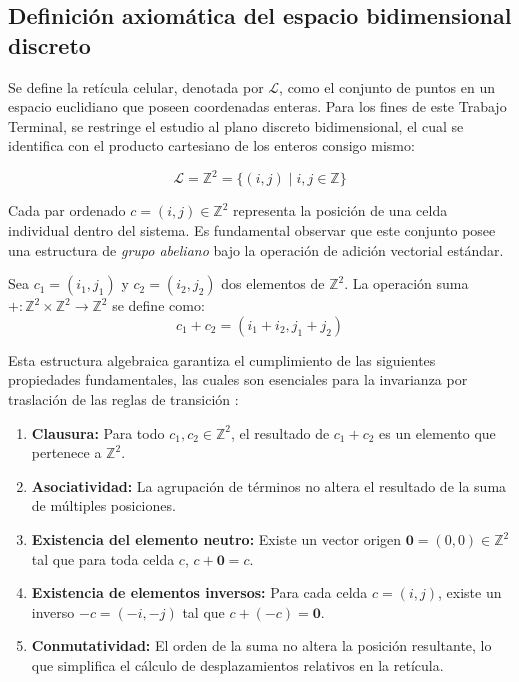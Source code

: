 \subsection{Definición axiomática del espacio bidimensional discreto}

Se define la retícula celular, denotada por $\mathcal{L}$, como el conjunto de puntos en un espacio euclidiano que poseen coordenadas enteras. Para los fines de este Trabajo Terminal, se restringe el estudio al plano discreto bidimensional, el cual se identifica con el producto cartesiano de los enteros consigo mismo:

\begin{equation}
    \mathcal{L} = \mathbb{Z}^2 = \{ (i, j) \mid i, j \in \mathbb{Z} \}
\end{equation}

Cada par ordenado $c = (i, j) \in \mathbb{Z}^2$ representa la posición de una celda individual dentro del sistema. Es fundamental observar que este conjunto posee una estructura de \textit{grupo abeliano} bajo la operación de adición vectorial estándar. 

\begin{definition}
Sea $c_1 = (i_1, j_1)$ y $c_2 = (i_2, j_2)$ dos elementos de $\mathbb{Z}^2$. La operación suma $+ : \mathbb{Z}^2 \times \mathbb{Z}^2 \rightarrow \mathbb{Z}^2$ se define como:
\begin{equation}
    c_1 + c_2 = (i_1 + i_2, j_1 + j_2)
\end{equation}
\end{definition}

Esta estructura algebraica garantiza el cumplimiento de las siguientes propiedades fundamentales, las cuales son esenciales para la invarianza por traslación de las reglas de transición \cite{Kari2005}:

\begin{enumerate}
    \item \textbf{Clausura:} Para todo $c_1, c_2 \in \mathbb{Z}^2$, el resultado de $c_1 + c_2$ es un elemento que pertenece a $\mathbb{Z}^2$.
    \item \textbf{Asociatividad:} La agrupación de términos no altera el resultado de la suma de múltiples posiciones.
    \item \textbf{Existencia del elemento neutro:} Existe un vector origen $\mathbf{0} = (0, 0) \in \mathbb{Z}^2$ tal que para toda celda $c$, $c + \mathbf{0} = c$.
    \item \textbf{Existencia de elementos inversos:} Para cada celda $c = (i, j)$, existe un inverso $-c = (-i, -j)$ tal que $c + (-c) = \mathbf{0}$.
    \item \textbf{Conmutatividad:} El orden de la suma no altera la posición resultante, lo que simplifica el cálculo de desplazamientos relativos en la retícula.
\end{enumerate}

